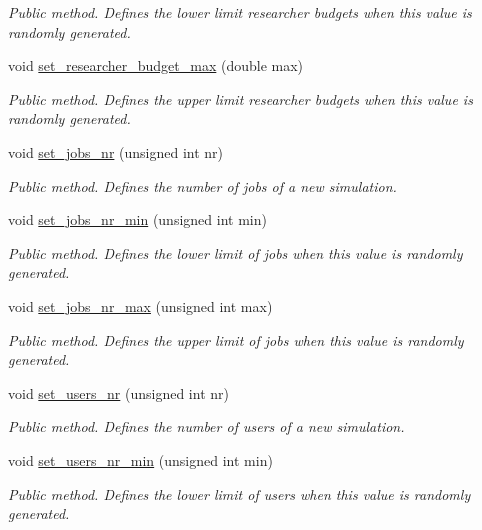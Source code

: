 \begin{DoxyCompactItemize}
\begin{DoxyCompactList}\small\item\em Public method. Defines the lower limit researcher budgets when this value is randomly generated. \end{DoxyCompactList}\item 
void \hyperlink{classConfiguration_add79fec297e6e38097b3a0b9968c8d2c}{set\+\_\+researcher\+\_\+budget\+\_\+max} (double max)
\begin{DoxyCompactList}\small\item\em Public method. Defines the upper limit researcher budgets when this value is randomly generated. \end{DoxyCompactList}\item 
void \hyperlink{classConfiguration_a915a2e408d2c2b95e0e7cfe4a5842c2d}{set\+\_\+jobs\+\_\+nr} (unsigned int nr)
\begin{DoxyCompactList}\small\item\em Public method. Defines the number of jobs of a new simulation. \end{DoxyCompactList}\item 
void \hyperlink{classConfiguration_a5132f41c23a73bb4fded422f325cbbe6}{set\+\_\+jobs\+\_\+nr\+\_\+min} (unsigned int min)
\begin{DoxyCompactList}\small\item\em Public method. Defines the lower limit of jobs when this value is randomly generated. \end{DoxyCompactList}\item 
void \hyperlink{classConfiguration_a288259d1e0c47f99ddd0feec5ade6d93}{set\+\_\+jobs\+\_\+nr\+\_\+max} (unsigned int max)
\begin{DoxyCompactList}\small\item\em Public method. Defines the upper limit of jobs when this value is randomly generated. \end{DoxyCompactList}\item 
void \hyperlink{classConfiguration_a0e27b300afd52eb1a07f202ee8a05746}{set\+\_\+users\+\_\+nr} (unsigned int nr)
\begin{DoxyCompactList}\small\item\em Public method. Defines the number of users of a new simulation. \end{DoxyCompactList}\item 
void \hyperlink{classConfiguration_aca5c8d3046cc871ce78b0c6ef0d3cda6}{set\+\_\+users\+\_\+nr\+\_\+min} (unsigned int min)
\begin{DoxyCompactList}\small\item\em Public method. Defines the lower limit of users when this value is randomly generated. \end{DoxyCompactList}\item 

\end{DoxyCompactItemize}
